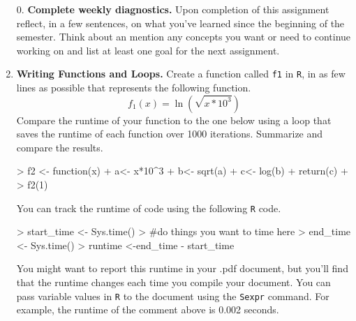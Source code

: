 \documentclass{article}
\begin{document}
\begin{enumerate}
  \item[0.] \textbf{Complete weekly diagnostics.} Upon completion of this assignment
  reflect, in a few sentences, on what you've learned since the beginning of the semester.
  Think about an mention any concepts you want or need to continue working on and
  list at least one goal for the next assignment.
  \item \textbf{Writing Functions and Loops.} Create a function called \texttt{f1} 
  in \texttt{R}, in as few lines as possible that represents the  following function.
    \[f_1(x) = \ln\left(\sqrt{x*10^3}\right)\]
    Compare the runtime of your function to the one below using a loop that saves 
    the runtime of each function over 1000 iterations. Summarize and compare the results.
\begin{Schunk}
\begin{Sinput}
> f2 <- function(x){
+   a<- x*10^3
+   b<- sqrt(a)
+   c<- log(b)
+   return(c)
+ }
> f2(1)
\end{Sinput}
\end{Schunk}
You can track the runtime of code using the following \texttt{R} code.
\begin{Schunk}
\begin{Sinput}
> start_time <- Sys.time()
> #do things you want to time here
> end_time <- Sys.time()
> runtime <-end_time - start_time
\end{Sinput}
\end{Schunk}
You might want to report this runtime in your .pdf document, but you'll find that the 
runtime changes each time you compile your document. You can pass variable values in \texttt{R}
to the document using the \texttt{Sexpr} command. For example, the runtime of the comment above
is 0.002 seconds.


\end{enumerate}
\end{document}
